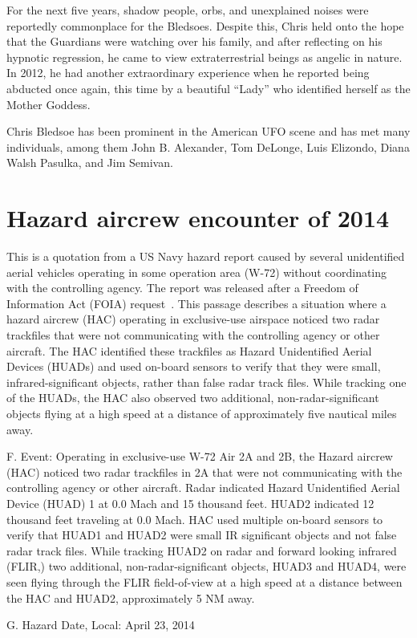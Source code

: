 For the next five years, shadow people, orbs, and unexplained noises were reportedly commonplace for the Bledsoes. Despite this, Chris held onto the hope that the Guardians were watching over his family, and after reflecting on his hypnotic regression, he came to view extraterrestrial beings as angelic in nature. In 2012, he had another extraordinary experience when he reported being abducted once again, this time by a beautiful ``Lady'' who identified herself as the Mother Goddess.

Chris Bledsoe has been prominent in the American UFO scene and has met many individuals, among them
John B. Alexander,
Tom DeLonge,
Luis Elizondo,
Diana Walsh Pasulka, and
Jim Semivan.




\section{Hazard aircrew encounter of 2014}

This is a quotation from a US Navy hazard report caused by several unidentified aerial vehicles operating in some operation area (W-72)
without coordinating with the controlling agency. The report was released after a Freedom of Information Act (FOIA) request~\cite{Hazard-2014-navi-foia}.
This passage describes a situation where a hazard aircrew (HAC) operating in exclusive-use airspace noticed
two radar trackfiles that were not communicating with the controlling agency or other aircraft.
The HAC identified these trackfiles as Hazard Unidentified Aerial Devices (HUADs)
and used on-board sensors to verify that they were small, infrared-significant objects,
rather than false radar track files. While tracking one of the HUADs,
the HAC also observed two additional, non-radar-significant objects flying at a high speed at a distance of approximately five nautical miles away.


\begin{svgraybox}
\noindent F. Event:
Operating in exclusive-use W-72 Air 2A and 2B, the Hazard aircrew (HAC) noticed two radar trackfiles
in 2A that were not communicating with the controlling agency or other aircraft. Radar indicated Hazard
Unidentified Aerial Device (HUAD) 1 at 0.0 Mach and 15 thousand feet. HUAD2 indicated 12 thousand feet
traveling at 0.0 Mach. HAC used multiple on-board sensors to verify that HUAD1 and HUAD2 were small IR
significant objects and not false radar track files. While tracking HUAD2 on radar and forward looking
infrared (FLIR,) two additional, non-radar-significant objects, HUAD3 and HUAD4, were seen flying through
the FLIR field-of-view at a high speed at a distance between the HAC and HUAD2, approximately 5 NM
away.

\noindent G. Hazard Date, Local: April 23, 2014
\end{svgraybox}

